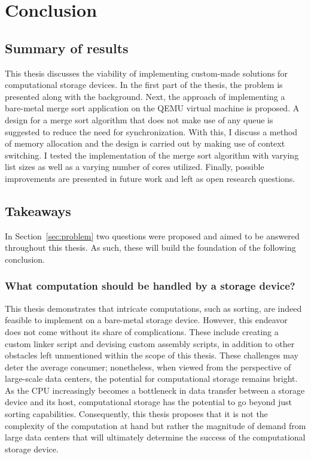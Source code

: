\section{Conclusion}
\subsection{Summary of results}
This thesis discusses the viability of implementing custom-made solutions for
computational storage devices. In the first part of the thesis, the problem is
presented along with the background. Next, the approach of implementing a
bare-metal merge sort application on the QEMU virtual machine is proposed. A
design for a merge sort algorithm that does not make use of any queue is
suggested to reduce the need for synchronization. With this, I discuss a method
of memory allocation and the design is carried out by making use of context
switching. I tested the implementation of the merge sort algorithm with varying
list sizes as well as a varying number of cores utilized. Finally, possible
improvements are presented in future work and left as open research questions.

\subsection{Takeaways}
In Section~\ref{sec:problem} two questions were proposed and aimed to be
answered throughout this thesis. As such, these will build the foundation of the
following conclusion.

\subsubsection*{What computation should be handled by a storage device?}
This thesis demonstrates that intricate computations, such as sorting, are
indeed feasible to implement on a bare-metal storage device. However, this
endeavor does not come without its share of complications. These include
creating a custom linker script and devising custom assembly scripts, in
addition to other obstacles left unmentioned within the scope of this thesis.
These challenges may deter the average consumer; nonetheless, when viewed from
the perspective of large-scale data centers, the potential for computational
storage remains bright. As the CPU increasingly becomes a bottleneck in data
transfer between a storage device and its host, computational storage has the
potential to go beyond just sorting capabilities. Consequently, this thesis
proposes that it is not the complexity of the computation at hand but rather the
magnitude of demand from large data centers that will ultimately determine the
success of the computational storage device.


